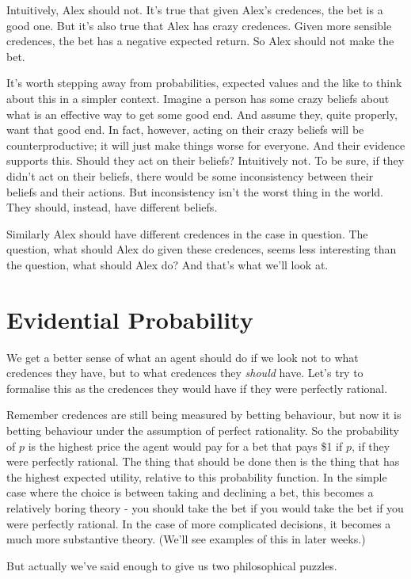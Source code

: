 Intuitively, Alex should not. It's true that given Alex's credences, the bet is a good one. But it's also true that Alex has crazy credences. Given more sensible credences, the bet has a negative expected return. So Alex should not make the bet.

It's worth stepping away from probabilities, expected values and the like to think about this in a simpler context. Imagine a person has some crazy beliefs about what is an effective way to get some good end. And assume they, quite properly, want that good end. In fact, however, acting on their crazy beliefs will be counterproductive; it will just make things worse for everyone. And their evidence supports this. Should they act on their beliefs? Intuitively not. To be sure, if they didn't act on their beliefs, there would be some inconsistency between their beliefs and their actions. But inconsistency isn't the worst thing in the world. They should, instead, have different beliefs.

Similarly Alex should have different credences in the case in question. The question, what should Alex do given these credences, seems less interesting than the question, what should Alex do? And that's what we'll look at.

\section{Evidential Probability}
We get a better sense of what an agent should do if we look not to what credences they have, but to what credences they \textit{should} have. Let's try to formalise this as the credences they would have if they were perfectly rational. 

Remember credences are still being measured by betting behaviour, but now it is betting behaviour under the assumption of perfect rationality. So the probability of $p$ is the highest price the agent would pay for a bet that pays \$1 if $p$, if they were perfectly rational. The thing that should be done then is the thing that has the highest expected utility, relative to this probability function. In the simple case where the choice is between taking and declining a bet, this becomes a relatively boring theory - you should take the bet if you would take the bet if you were perfectly rational. In the case of more complicated decisions, it becomes a much more substantive theory. (We'll see examples of this in later weeks.)

But actually we've said enough to give us two philosophical puzzles. 

